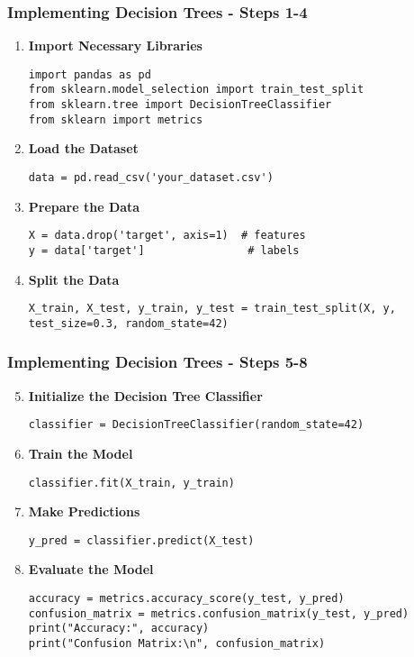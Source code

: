 \documentclass[aspectratio=169]{beamer}
\begin{document}
\begin{frame}[fragile]
    \frametitle{Implementing Decision Trees - Steps 1-4}
    \begin{enumerate}
        \item \textbf{Import Necessary Libraries}
        \begin{lstlisting}
import pandas as pd
from sklearn.model_selection import train_test_split
from sklearn.tree import DecisionTreeClassifier
from sklearn import metrics
        \end{lstlisting}

        \item \textbf{Load the Dataset}
        \begin{lstlisting}
data = pd.read_csv('your_dataset.csv')
        \end{lstlisting}

        \item \textbf{Prepare the Data}
        \begin{lstlisting}
X = data.drop('target', axis=1)  # features
y = data['target']                # labels
        \end{lstlisting}

        \item \textbf{Split the Data}
        \begin{lstlisting}
X_train, X_test, y_train, y_test = train_test_split(X, y, test_size=0.3, random_state=42)
        \end{lstlisting}
    \end{enumerate}
\end{frame}

\begin{frame}[fragile]
    \frametitle{Implementing Decision Trees - Steps 5-8}
    \begin{enumerate}
        \setcounter{enumi}{4} %
        \item \textbf{Initialize the Decision Tree Classifier}
        \begin{lstlisting}
classifier = DecisionTreeClassifier(random_state=42)
        \end{lstlisting}

        \item \textbf{Train the Model}
        \begin{lstlisting}
classifier.fit(X_train, y_train)
        \end{lstlisting}

        \item \textbf{Make Predictions}
        \begin{lstlisting}
y_pred = classifier.predict(X_test)
        \end{lstlisting}

        \item \textbf{Evaluate the Model}
        \begin{lstlisting}
accuracy = metrics.accuracy_score(y_test, y_pred)
confusion_matrix = metrics.confusion_matrix(y_test, y_pred)
print("Accuracy:", accuracy)
print("Confusion Matrix:\n", confusion_matrix)
        \end{lstlisting}
    \end{enumerate}
\end{frame}
\end{document}
